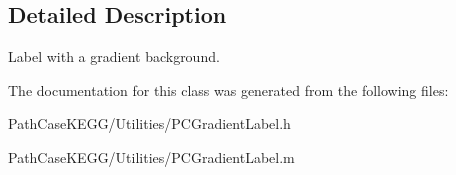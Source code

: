 \subsection{Detailed Description}
Label with a gradient background. 

The documentation for this class was generated from the following files:\begin{DoxyCompactItemize}
\item 
PathCaseKEGG/Utilities/PCGradientLabel.h\item 
PathCaseKEGG/Utilities/PCGradientLabel.m\end{DoxyCompactItemize}
